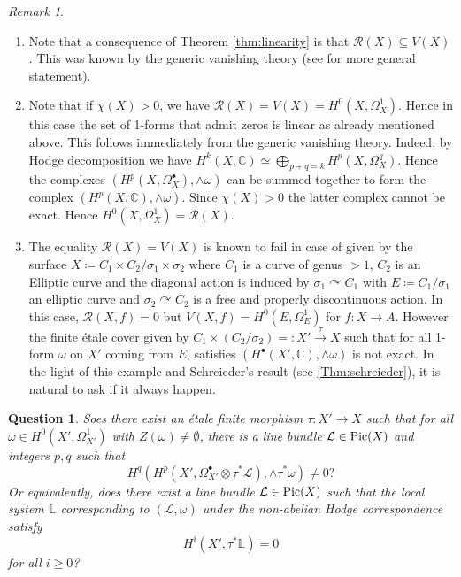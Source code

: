 \documentclass[12pt,reqno]{amsart}
\theoremstyle{question}
\newtheorem{question}[theorem]{Question}
\theoremstyle{definition}
\theoremstyle{remark}
\newtheorem{remark}[theorem]{Remark}
\theoremstyle{cited}
\theoremstyle{citeddef}
\def\Pic{{\rm Pic}}
\newcommand{\sL}{\mathcal{L}}
\newcommand{\sR}{\mathcal{R}}
\newcommand{\bbC}{\mathbb{C}}
\newcommand{\bbL}{\mathbb{L}}
\def\acts{\curvearrowright}
\begin{document}
\begin{remark}
\begin{enumerate}
\item Note that a consequence of Theorem \ref{thm:linearity} is that $\sR(X)\subseteq V(X)$. This was known by the generic vanishing theory
(see \cite{BWY} for more general statement). 
\item Note that if $\chi(X)>0$, we have $\sR(X) = V(X) = H^0(X, \Omega_X^1)$. Hence in this case the set of 1-forms that admit zeros is linear as already mentioned above. 
This follows immediately from the generic vanishing theory. Indeed, by Hodge decomposition
we have
$H^k(X,\bbC) \simeq \bigoplus_{p+q = k} H^p(X,\Omega_X^q)$. Hence the complexes $(H^p(X, \Omega_X^{\bullet}), \wedge\omega)$ can be summed together to form the complex $(H^p(X, \bbC), \wedge\omega)$. Since $\chi(X)>0$ the latter complex cannot be exact. Hence $H^0(X,\Omega_X^1)
= \sR(X)$.
\item The equality $\sR(X) = V(X)$ is known to fail
in case of \cite[Example 1.11]{DJL17} given by the surface $X \coloneqq C_1\times C_2/\sigma_1\times \sigma_2$ where $C_1$ is a curve of genus $>1$, $C_2$ is an Elliptic curve and the diagonal action is induced by $\sigma_1 \acts C_1$ with $E \coloneqq C_1/\sigma_1$ an elliptic curve and $\sigma_2\acts C_2$ is a free and properly discontinuous action. In this case, $\sR(X, f) = 0$
but $V(X, f) = H^0(E, \Omega_E^1)$ for $f\colon X\to A$. 
However the
finite \'etale cover given by $C_1\times (C_2/\sigma_2)=:X'\xrightarrow{\tau} X$ such that for all 1-form $\omega$ on $X'$ coming from $E$,
satisfies $(H^{\bullet}(X', \bbC), \wedge\omega)$ is not exact. In the light of this example and Schreieder's result (see \ref{Thm:schreieder}), it is natural to ask if it always happen.
\end{enumerate}
\end{remark}
\begin{question}
Soes there exist an \'etale finite morphism $\tau\colon  X' \to X$ 
such that for all $\omega \in H^0(X', \Omega_{X'}^1)$ with
$Z(\omega)\neq \emptyset$, there is a line bundle $\sL\in\Pic(X)$
and integers $p, q$ such that
\[ H^q(H^{p}(X', \Omega_{X'}^{\bullet}\otimes \tau^*\sL), \wedge \tau^*\omega)\neq 0?\]
Or equivalently, does there exist a line bundle $\sL\in\Pic(X)$ such that the local system $\bbL$ corresponding to
$(\sL, \omega)$ under the non-abelian Hodge correspondence satisfy
\[ H^{i}(X', \tau^*\bbL) =0\]
for all $i\geq 0$?
\end{question}
\end{document}
